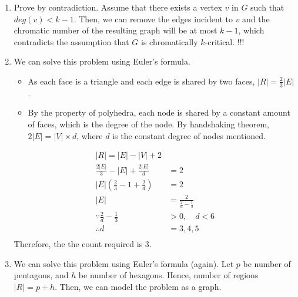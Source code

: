 \documentclass{article}
\begin{document}
\begin{enumerate}[label=(\alph*)]
    \item Prove by contradiction. Assume that there exists a vertex $v$ in $G$ such that $deg(v) < k-1$. Then, we can remove the edges incident to $v$ and the chromatic number of the resulting graph will be at most $k-1$, which contradicts the assumption that $G$ is chromatically $k$-critical. !!!
    \item We can solve this problem using Euler's formula.
          \begin{itemize}
              \item As each face is a triangle and each edge is shared by two faces, $|R| = \frac23 |E|$.
              \item By the property of polyhedra, each node is shared by a constant amount of faces, which is the degree of the node. By handshaking theorem, $2|E| = |V| \times d$, where $d$ is the constant degree of nodes mentioned.
          \end{itemize}
          \begin{align*}
              |R| = |E| - |V| + 2                                                           \\
              \frac{2|E|}{3} - |E| + \frac{2|E|}{d} & = 2                                   \\
              |E|(\frac{2}{3} - 1 + \frac{2}{d})    & = 2                                   \\
              |E|                                   & = \frac{2}{\frac{2}{d} - \frac{1}{3}} \\
              \because \frac{2}{d} - \frac{1}{3}    & > 0,\quad d < 6                       \\
              \therefore d                          & = 3,4,5                               \\
          \end{align*}
          Therefore, the the count required is 3.
    \item We can solve this problem using Euler's formula (again). Let $p$ be number of pentagons, and $h$ be number of hexagons. Hence, number of regions $|R| = p + h$. Then, we can model the problem as a graph.


\end{enumerate}
\end{document}

